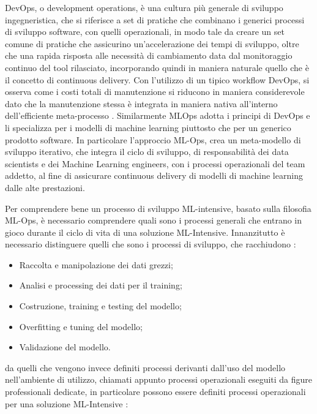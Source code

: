 DevOps, o development operations, è una cultura più generale di sviluppo ingegneristica, che si riferisce a set di pratiche che combinano i generici processi di sviluppo software, con quelli operazionali, in modo tale da creare un set comune di pratiche che assicurino un'accelerazione dei tempi di sviluppo, oltre che una rapida risposta alle necessità di cambiamento data dal monitoraggio continuo del tool rilasciato, incorporando quindi in maniera naturale quello che è il concetto di continuous delivery\cite{MLOpsBook}. Con l'utilizzo di un tipico workflow DevOps, si osserva come i costi totali di manutenzione si riducono in maniera considerevole dato che la manutenzione stessa è integrata in maniera nativa all'interno dell'efficiente meta-processo \cite{MLOpsBook}. Similarmente MLOps adotta i principi di DevOps e li specializza per i modelli di machine learning piuttosto che per un generico prodotto software. In particolare l'approccio ML-Ops, crea un meta-modello di sviluppo iterativo, che integra il ciclo di sviluppo, di responsabilità dei data scientists e dei Machine Learning engineers, con i processi operazionali del team addetto, al fine di assicurare continuous delivery di modelli di machine learning dalle alte prestazioni\cite{MLOpsBook}.

Per comprendere bene un processo di sviluppo ML-intensive, basato sulla filosofia ML-Ops, è necessario comprendere  quali sono i processi generali che entrano in gioco durante il ciclo di vita di una soluzione ML-Intensive. Innanzitutto è necessario distinguere quelli che sono i processi di sviluppo, che racchiudono \cite{MLOpsBook}:

\begin{itemize}
    \item Raccolta e manipolazione dei dati grezzi;
    \item Analisi e processing dei dati per il training;
    \item Costruzione, training e testing del modello;
    \item Overfitting e tuning del modello;
    \item Validazione del modello.
    
\end{itemize}

da quelli che vengono invece definiti processi derivanti dall'uso del modello nell'ambiente di utilizzo, chiamati appunto processi operazionali eseguiti da figure professionali dedicate, in particolare possono essere definiti processi operazionali per una soluzione ML-Intensive \cite{MLOpsBook}:

